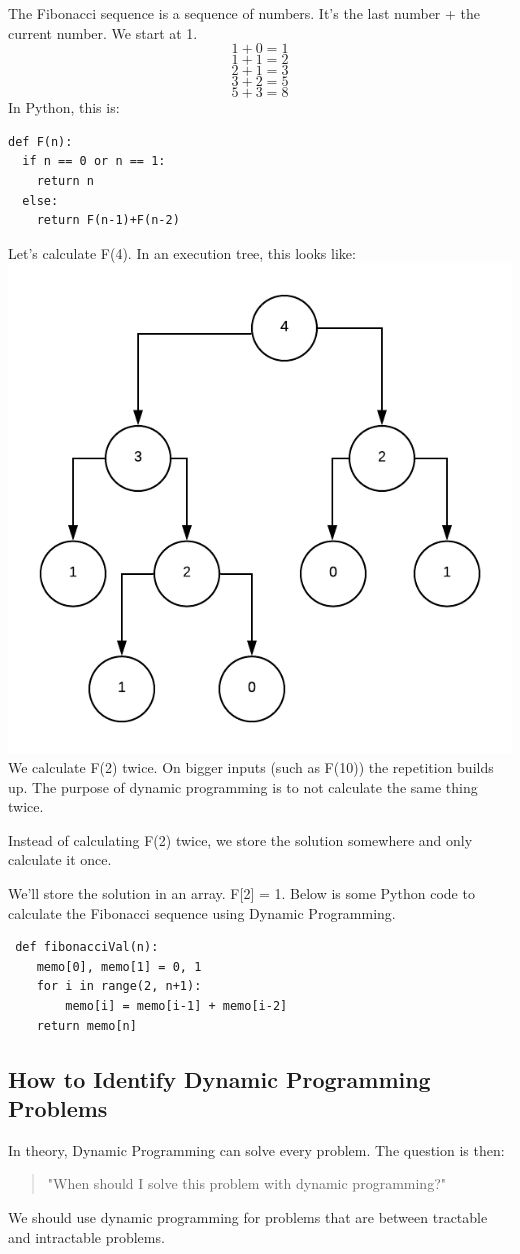 \documentclass{article}
\begin{document}
The Fibonacci sequence is a sequence of numbers. It's the last number + the current number. We start at 1. 
$$1 + 0 = 1$$
$$1 + 1 = 2$$
$$2 + 1 = 3$$
$$3 + 2 = 5$$
$$5 + 3 = 8$$
In Python, this is:
\begin{verbatim}
def F(n):
  if n == 0 or n == 1:
	return n
  else:
	return F(n-1)+F(n-2)
\end{verbatim}
Let's calculate F(4). In an execution tree, this looks like:
 \includegraphics[width=\textwidth,height=\textheight,keepaspectratio]{l.png}
 We calculate F(2) twice. On bigger inputs (such as F(10)) the repetition builds up. The purpose of dynamic programming is to not calculate the same thing twice.
 
 Instead of calculating F(2) twice, we store the solution somewhere and only calculate it once.
 
 We'll store the solution in an array. F[2] = 1. Below is some Python code to calculate the Fibonacci sequence using Dynamic Programming.
 \begin{verbatim}
 def fibonacciVal(n):
	memo[0], memo[1] = 0, 1
	for i in range(2, n+1):
		memo[i] = memo[i-1] + memo[i-2]
	return memo[n]
\end{verbatim}
\newpage
\subsection{How to Identify Dynamic Programming Problems}
In theory, Dynamic Programming can solve every problem. The question is then:
\begin{quote}
    "When should I solve this problem with dynamic programming?"
\end{quote}
We should use dynamic programming for problems that are between tractable and intractable problems. 
\end{document}
